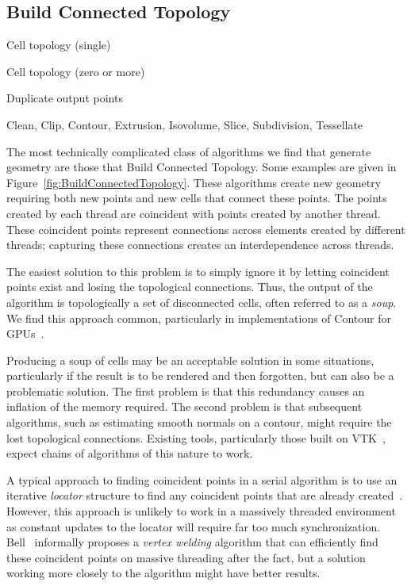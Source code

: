 \documentclass{sig-alternate}
\newcommand*{\lcite}[1]{~\cite{#1}}
\newcommand*{\scite}[1]{~\cite{#1}}
\newcommand*{\keyterm}[1]{\emph{#1}}
\newcommand{\algclass}[1]{\textsf{#1}}
\newcommand{\alg}[1]{#1}
\newcommand{\algorithmclasssection}[1]{\subsection*{#1}}
\newcommand{\algorithmclass}[5]{
  \algorithmclasssection{#1} %
  \begin{description}[leftmargin=9em,style=nextline,noitemsep]
    \raggedright
  \item[Input] #2
  \item[Output] #3
  \item[Interdependence] #4
  \item[Algorithms] #5
  \end{description}
}
\begin{document}
\algorithmclass{Build Connected Topology}
               {Cell topology (single)} %
               {Cell topology (zero or more)} %
               {Duplicate output points} %
               {
                 Clean,
                 Clip,
                 Contour,
                 Extrusion,
                 Isovolume,
                 Slice,
                 Subdivision,
                 Tessellate
               }

\noindent
The most technically complicated class of algorithms we find that generate
geometry are those that \algclass{Build Connected Topology}. Some examples
are given in Figure~\ref{fig:BuildConnectedTopology}. These algorithms
create new geometry requiring both new points and new cells that connect
these points. The points created by each thread are coincident with points
created by another thread. These coincident points represent connections
across elements created by different threads; capturing these connections
creates an interdependence across threads.

The easiest solution to this problem is to simply ignore it by letting
coincident points exist and losing the topological connections. Thus, the
output of the algorithm is topologically a set of disconnected cells, often
referred to as a \keyterm{soup}. We find this approach common, particularly
in implementations of \alg{Contour} for
GPUs\lcite{PISTON,Dyken2008,Pascucci2004,Klein2004}.

Producing a soup of cells may be an acceptable solution in some situations,
particularly if the result is to be rendered and then forgotten, but can
also be a problematic solution. The first problem is that this redundancy
causes an inflation of the memory required. The second problem is that
subsequent algorithms, such as estimating smooth normals on a contour,
might require the lost topological connections. Existing tools,
particularly those built on VTK\lcite{VTK}, expect chains of algorithms of
this nature to work.

A typical approach to finding coincident points in a serial algorithm is to
use an iterative \keyterm{locator} structure to find any coincident points
that are already created\lcite{VTKUsersGuide}. However, this approach is
unlikely to work in a massively threaded environment as constant updates to
the locator will require far too much synchronization. Bell\scite{Bell2010}
informally proposes a \keyterm{vertex welding} algorithm that can
efficiently find these coincident points on massive threading after the
fact, but a solution working more closely to the algorithm might have
better results.
\end{document}
